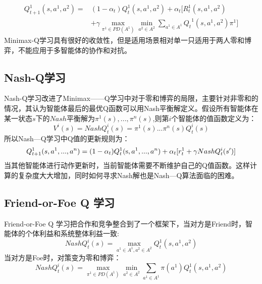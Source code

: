\begin{equation}
\begin{aligned}
Q_{t + 1}^1(s,{a^1},{a^2}) =& (1 - {\alpha _t})Q_t^1(s,{a^1},{a^2}) + {\alpha _t}[R_t^1(s,{a^1},{a^2}) \\& + \gamma\mathop {\max }\limits_{{\pi ^1} \in PD({A^1})} \mathop {\min }\limits_{{a^2} \in {A^2}} \sum\limits_{{a^1} \in {A^1}} {{Q_t}^1(s,{a^1},{a^2})} {\pi ^1} ]
\end{aligned}
\end{equation}
Minimax-Q学习具有很好的收敛性，但是适用场景相对单一只适用于两人零和博弈，不能应用于多智能体的协作和对抗。
\subsection{Nash-Q学习}
Nash-Q学习改进了Minimax——Q学习中对于零和博弈的局限，主要针对非零和的情况，其认为智能体最后的最优Q函数可以用Nash平衡解定义。假设所有智能体在某一状态$s$下的$Nash$平衡解为${\pi ^1}(s),...,{\pi ^n}(s)$,则第$i$个智能体的值函数定义为：
\begin{equation}
	{V^i}(s) = NashQ_t^i(s) = {\pi ^1}(s)...{\pi ^n}(s)Q_t^i(s)
\end{equation}
所以Nash—Q学习中Q值的更新规则为：
\begin{equation}
Q_{t + 1}^1(s,{a^1},...,{a^n}) = (1 - {\alpha _t})Q_t^1({\rm{s}},{a^1},...,{a^n}) + {\alpha _t}[r_t^1 + \gamma NashQ_t^i(s')]
\end{equation}
当其他智能体进行动作更新时，当前智能体需要不断维护自己的Q值函数。这样计算的复杂度大大增加，同时如何寻求Nash解也是Nash—Q算法面临的困难。
\subsection{Friend-or-Foe Q 学习}
Friend-or-Foe Q 学习把合作和竞争整合到了一个框架下，当对方是Friend时，智能体的个体利益和系统整体利益一致:
\begin{equation}
NashQ_t^i(s) = \mathop {\max }\limits_{{a^1} \in {A^1},{a^2} \in {A^2}} Q_t^1(s,{a^1},{a^2})
\end{equation}
当对方是Foe时，对策变为零和博弈：
\begin{equation}
	NashQ_t^i(s) = \mathop {\max }\limits_{{\pi ^1} \in PD({A^1})} \mathop {\min }\limits_{{a^2} \in {A^2}} \sum\limits_{{a^1} \in {A^1}} {\pi ({a^1})} Q_t^1(s,{a^1},{a^2})
\end{equation}

